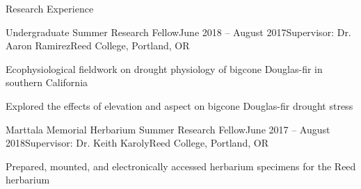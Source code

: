 \documentclass{resume} %
\begin{document}
\begin{rSection}{Research Experience}

\begin{rSubsection}{Undergraduate Summer Research Fellow}{June 2018 -- August 2017}{Supervisor: Dr. Aaron Ramirez}{Reed College, Portland, OR}
\item Ecophysiological fieldwork on drought physiology of bigcone Douglas-fir in southern California
\item Explored the effects of elevation and aspect on bigcone Douglas-fir drought stress
\end{rSubsection}


\begin{rSubsection}{Marttala Memorial Herbarium Summer Research Fellow}{June 2017 -- August 2018}{Supervisor: Dr. Keith Karoly}{Reed College, Portland, OR}
\item Prepared, mounted, and electronically accessed herbarium specimens for the Reed herbarium
\end{rSubsection}


\end{rSection}

\end{document}
